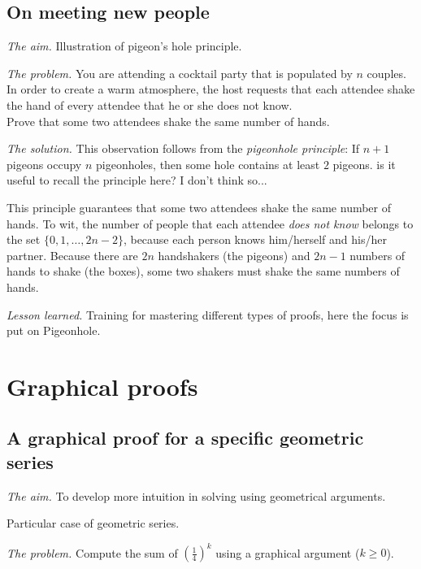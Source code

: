 \subsection{On meeting new people}

\noindent \textit{The aim.}
Illustration of pigeon's hole principle.
\medskip

\noindent \textit{The problem.}
You are attending a cocktail party that is populated by $n$ couples.
In order to create a warm atmosphere, the host requests that each
attendee shake the hand of every attendee that he or she does not
know. \\
Prove that some two attendees shake the same number of hands.
\medskip

\noindent \textit{The solution.}
%
This observation follows from the \textit{pigeonhole principle}:
If $n+1$ pigeons occupy $n$ pigeonholes, then some hole contains
at least $2$ pigeons.
{\Denis is it useful to recall the principle here? I don't think so...}

This principle guarantees that some two attendees shake the same
number of hands.  To wit, the number of people that each attendee {\em
  does not know} belongs to the set $\{ 0, 1, \ldots, 2n-2 \}$,
because each person knows him/herself and his/her partner.  Because
there are $2n$ handshakers (the pigeons) and $2n-1$ numbers of hands
to shake (the boxes), some two shakers must shake the same numbers of
hands. 
\medskip

\noindent \textit{Lesson learned.}
Training for mastering different types of proofs, here the focus is put on Pigeonhole.



\section{Graphical proofs}

\subsection{A graphical proof for a specific geometric series}

\noindent \textit{The aim.}
To develop more intuition in solving using geometrical arguments.

Particular case of geometric series.
\medskip

\noindent \textit{The problem.}
Compute the sum of $(\frac{1}{4})^k$ using a graphical argument ($k \geq 0$).
\medskip

